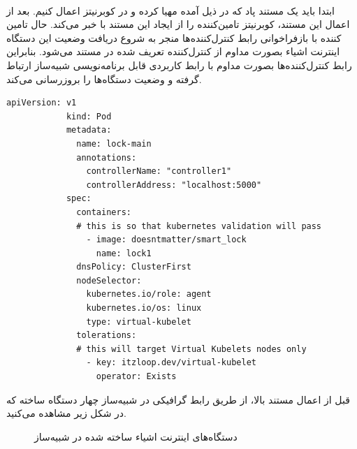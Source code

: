 \paragraph{}
{
    ابتدا باید یک مستند پاد که در ذیل آمده مهیا کرده و در کوبرنیتز اعمال کنیم. بعد از اعمال این مستند،
    کوبرنیتز تامین‌کننده را از ایجاد این مستند با خبر می‌کند. حال تامین کننده با بازفراخوانی رابط کنترل‌کننده‌ها
    منجر به شروع دریافت وضعیت این دستگاه اینترنت اشیاء بصورت مداوم از کنترل‌کننده تعریف شده در مستند می‌شود.
    بنابراین رابط کنترل‌کننده‌ها بصورت مداوم با رابط کاربردی قابل برنامه‌نویسی شبیه‌ساز ارتباط گرفته و وضعیت دستگاه‌ها
    را بروزرسانی می‌کند.
    \newpage
    \begin{latin}
        \begin{lstlisting}[caption=کوبرنیتز در پاد ساخت مستند]
            apiVersion: v1
            kind: Pod
            metadata:
              name: lock-main
              annotations:
                controllerName: "controller1" 
                controllerAddress: "localhost:5000"
            spec:
              containers:
              # this is so that kubernetes validation will pass
                - image: doesntmatter/smart_lock
                  name: lock1
              dnsPolicy: ClusterFirst
              nodeSelector:
                kubernetes.io/role: agent
                kubernetes.io/os: linux
                type: virtual-kubelet
              tolerations:
              # this will target Virtual Kubelets nodes only
                - key: itzloop.dev/virtual-kubelet
                  operator: Exists
        \end{lstlisting}
    \end{latin}
    \newpage
    قبل از اعمال مستند بالا، از طریق رابط گرافیکی در  شبیه‌ساز چهار دستگاه ساخته که در شکل زیر مشاهده می‌کنید.
    \begin{figure}[H]
        \caption{دستگاه‌های اینترنت اشیاء ساخته شده در شبیه‌ساز}

\end{figure}}
